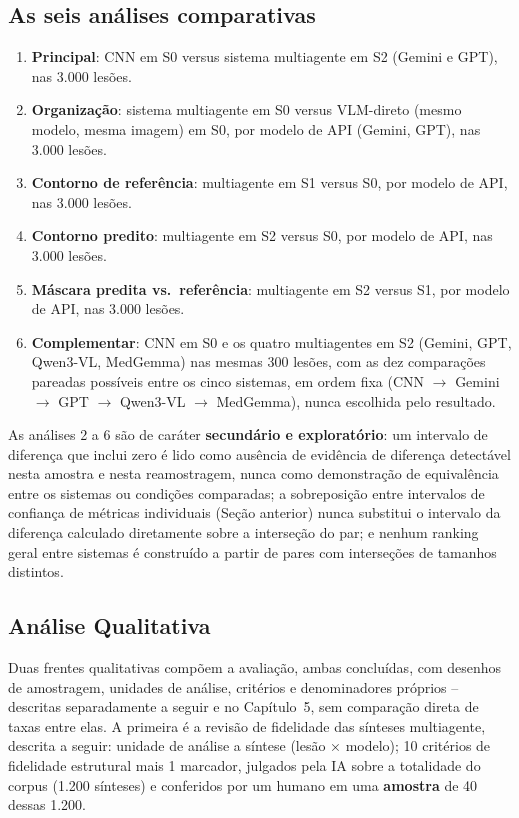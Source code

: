 \subsection{As seis análises comparativas}

\begin{enumerate}
	\item \textbf{Principal}: CNN em S0 versus sistema multiagente em S2 (Gemini e GPT), nas 3.000 lesões.
	\item \textbf{Organização}: sistema multiagente em S0 versus VLM-direto (mesmo modelo, mesma imagem) em S0, por modelo de API (Gemini, GPT), nas 3.000 lesões.
	\item \textbf{Contorno de referência}: multiagente em S1 versus S0, por modelo de API, nas 3.000 lesões.
	\item \textbf{Contorno predito}: multiagente em S2 versus S0, por modelo de API, nas 3.000 lesões.
	\item \textbf{Máscara predita vs.\ referência}: multiagente em S2 versus S1, por modelo de API, nas 3.000 lesões.
	\item \textbf{Complementar}: CNN em S0 e os quatro multiagentes em S2 (Gemini, GPT, Qwen3-VL, MedGemma) nas mesmas 300 lesões, com as dez comparações pareadas possíveis entre os cinco sistemas, em ordem fixa (CNN $\rightarrow$ Gemini $\rightarrow$ GPT $\rightarrow$ Qwen3-VL $\rightarrow$ MedGemma), nunca escolhida pelo resultado.
\end{enumerate}

As análises 2 a 6 são de caráter \textbf{secundário e exploratório}: um intervalo de diferença que inclui zero é lido como ausência de evidência de diferença detectável nesta amostra e nesta reamostragem, nunca como demonstração de equivalência entre os sistemas ou condições comparadas; a sobreposição entre intervalos de confiança de métricas individuais (Seção anterior) nunca substitui o intervalo da diferença calculado diretamente sobre a interseção do par; e nenhum ranking geral entre sistemas é construído a partir de pares com interseções de tamanhos distintos.

\subsection{Análise Qualitativa}
\label{sec:qualitativa}

Duas frentes qualitativas compõem a avaliação, ambas concluídas, com desenhos de amostragem, unidades de análise, critérios e denominadores próprios -- descritas separadamente a seguir e no Capítulo~5, sem comparação direta de taxas entre elas. A primeira é a revisão de fidelidade das sínteses multiagente, descrita a seguir: unidade de análise a síntese (lesão × modelo); 10 critérios de fidelidade estrutural mais 1 marcador, julgados pela IA sobre a totalidade do corpus (1.200 sínteses) e conferidos por um humano em uma \textbf{amostra} de 40 dessas 1.200.

